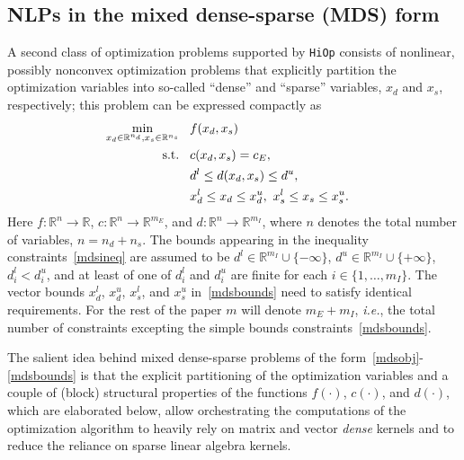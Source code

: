 \documentclass[11pt]{article}
\newcounter{line}
\newcommand{\Hi}{\texttt{HiOp}\xspace}
\begin{document}
\subsection{NLPs in the mixed dense-sparse (MDS) form}\label{sec:mds}
A second class of optimization problems supported by \Hi consists of nonlinear, possibly nonconvex optimization problems that explicitly partition the optimization variables into so-called ``dense'' and ``sparse'' variables, $x_d$ and $x_s$, respectively; this problem can be  expressed compactly as
\begin{align}
\min_{x_d\in\mathbb{R}^{n_d}, x_s\in\mathbb{R}^{n_s}} & \hspace{0.3cm} f(x_d, x_s) && \label{mdsobj}\\
\textnormal{s.t.} &\hspace{0.3cm}  c(x_d, x_s)=c_E, &&\\
 &\hspace{0.3cm} d^l \leq d(x_d, x_s) \leq d^u,  &&\label{mdsineq} \\
 &\hspace{0.3cm} x^{l}_{d} \leq x_d \leq x^{u}_{d}, \ x^{l}_{s} \leq x_s \leq x^{u}_{s}. &&\label{mdsbounds}
\end{align}
Here $f:\mathbb{R}^n\rightarrow\mathbb{R}$, $c:\mathbb{R}^n\rightarrow\mathbb{R}^{m_E}$, and $d:\mathbb{R}^n\rightarrow\mathbb{R}^{m_I}$, where $n$ denotes the total number of variables, $n=n_d + n_s$. The bounds appearing in the inequality constraints~\eqref{mdsineq} are assumed to be $d^l\in\mathbb{R}^{m_I}\cup\{-\infty\}$, $d^u\in\mathbb{R}^{m_I}\cup\{+\infty\}$, $d_i^l < d_i^u$, and at least of one of $d_i^l$ and $d_i^u$ are finite for each $i\in\{1,\ldots,m_I\}$. The vector bounds $x^{l}_{d}$, $x^{u}_{d}$, $x^{l}_{s}$, and $x^{u}_{s}$ in~\eqref{mdsbounds} need to satisfy identical requirements.  
For the rest of the paper $m$ will denote $m_E+m_I$, \textit{i.e.}, the total number of constraints excepting the simple bounds constraints~\eqref{mdsbounds}.

The salient idea behind mixed dense-sparse problems of the form~\eqref{mdsobj}-\eqref{mdsbounds} is that the explicit partitioning of the optimization variables and a couple of (block) structural properties of the functions $f(\cdot)$, $c(\cdot)$, and $d(\cdot)$, which are elaborated below, allow orchestrating the computations of the optimization algorithm to heavily rely on matrix and vector \textit{dense} kernels and to reduce the reliance on sparse linear algebra kernels.
\end{document}
